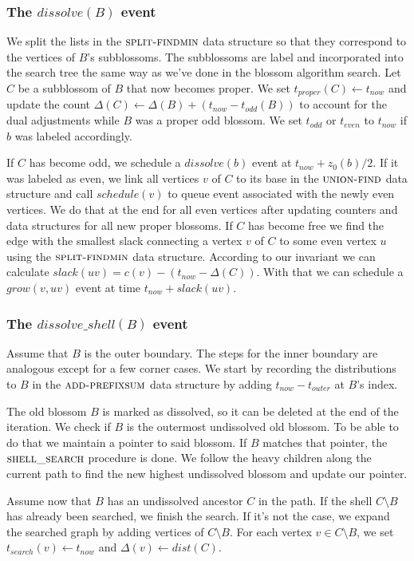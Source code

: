 \subsubsection*{The $dissolve(B)$ event} 
We split the lists in the $\textsc{split-findmin}$ data structure so that they correspond to the vertices of $B$'s subblossoms. The subblossoms are label and incorporated into the search tree the same way as we've done in the blossom algorithm search. Let $C$ be a subblossom of $B$ that now becomes proper. We set $t_{proper}(C) \gets t_{now}$ and update the count $\Delta(C) \gets \Delta(B) + (t_{now} - t_{odd}(B))$ to account for the dual adjustments while $B$ was a proper odd blossom. We set $t_{odd}$ or $t_{even}$ to $t_{now}$ if $b$ was labeled accordingly. 

If $C$ has become odd, we schedule a $dissolve(b)$ event at $t_{now} + z_0(b) / 2$. If it was labeled as even, we link all vertices $v$ of $C$ to its base in the $\textsc{union-find}$ data structure and call $schedule(v)$ to queue event associated with the newly even vertices. We do that at the end for all even vertices after updating counters and data structures for all new proper blossoms. If $C$ has become free we find the edge with the smallest slack connecting a vertex $v$ of $C$ to some even vertex $u$ using the $\textsc{split-findmin}$ data structure. According to our invariant we can calculate $slack(uv) = c(v) - (t_{now} - \Delta(C))$. With that we can schedule a $grow(v, uv)$ event at time $t_{now} + slack(uv)$. 

\subsubsection*{The $dissolve\_shell(B)$ event}
Assume that $B$ is the outer boundary. The steps for the inner boundary are analogous except for a few corner cases. We start by recording the distributions to $B$ in the $\textsc{add-prefixsum}$ data structure by adding $t_{now} - t_{outer}$ at $B$'s index.

The old blossom $B$ is marked as dissolved, so it can be deleted at the end of the iteration. We check if $B$ is the outermost undissolved old blossom. To be able to do that we maintain a pointer to said blossom. If $B$ matches that pointer, the $\textsc{shell\_search}$ procedure is done. We follow the heavy children along the current path to find the new highest undissolved blossom and update our pointer.

Assume now that $B$ has an undissolved ancestor $C$ in the path. If the shell $C \setminus B$ has already been searched, we finish the search. If it's not the case, we expand the searched graph by adding vertices of $C \setminus B$. For each vertex $v \in C \setminus B$, we set $t_{search}(v) \gets t_{now}$ and $\Delta(v) \gets dist(C)$.


